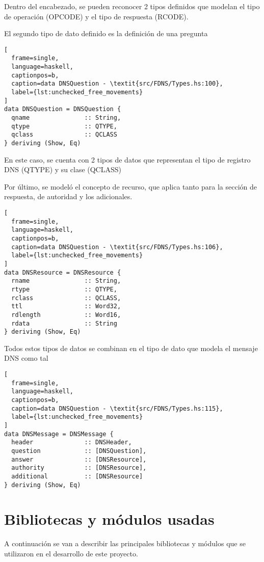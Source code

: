 \documentclass{article}
\begin{document}
Dentro del encabezado, se pueden reconocer 2 tipos definidos que modelan el
tipo de operación (OPCODE) y el tipo de respuesta (RCODE).

El segundo tipo de dato definido es la definición de una pregunta

\begin{lstlisting}[
  frame=single,
  language=haskell,
  captionpos=b,
  caption=data DNSQuestion - \textit{src/FDNS/Types.hs:100},
  label={lst:unchecked_free_movements}
]
data DNSQuestion = DNSQuestion {
  qname               :: String,
  qtype               :: QTYPE,
  qclass              :: QCLASS
} deriving (Show, Eq)
\end{lstlisting}

En este caso, se cuenta con 2 tipos de datos que representan el tipo de
registro DNS (QTYPE) y su clase (QCLASS)

Por último, se modeló el concepto de recurso, que aplica tanto para la
sección de respuesta, de autoridad y los adicionales.

\begin{lstlisting}[
  frame=single,
  language=haskell,
  captionpos=b,
  caption=data DNSQuestion - \textit{src/FDNS/Types.hs:106},
  label={lst:unchecked_free_movements}
]
data DNSResource = DNSResource {
  rname               :: String,
  rtype               :: QTYPE,
  rclass              :: QCLASS,
  ttl                 :: Word32,
  rdlength            :: Word16,
  rdata               :: String
} deriving (Show, Eq)
\end{lstlisting}

Todos estos tipos de datos se combinan en el tipo de dato que modela el mensaje
DNS como tal

\begin{lstlisting}[
  frame=single,
  language=haskell,
  captionpos=b,
  caption=data DNSQuestion - \textit{src/FDNS/Types.hs:115},
  label={lst:unchecked_free_movements}
]
data DNSMessage = DNSMessage {
  header              :: DNSHeader,
  question            :: [DNSQuestion],
  answer              :: [DNSResource],
  authority           :: [DNSResource],
  additional          :: [DNSResource]
} deriving (Show, Eq)
\end{lstlisting}


\section{Bibliotecas y módulos usadas}

A continuación se van a describir las principales bibliotecas y módulos que se
utilizaron en el desarrollo de este proyecto.
\end{document}
